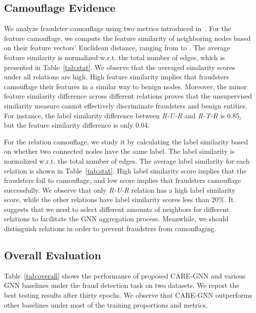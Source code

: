 \subsection{Camouflage Evidence}
\label{sec05:camoflage}
We analyze fraudster camouflage using two metrics introduced in~\cite{liu2020alleviating}. 
For the feature camouflage, we compute the feature similarity of neighboring nodes based on their feature vectors' Euclidean distance, ranging from  to .
The average feature similarity is normalized w.r.t. the total number of edges, which is presented in Table~\ref{tab:stat}.
We observe that the averaged similarity scores under all relations are high.
High feature similarity implies that fraudsters camouflage their features in a similar way to benign nodes.
Moreover, the minor feature similarity difference across different relations proves that the unsupervised similarity measure cannot effectively discriminate fraudsters and benign entities.
For instance, the label similarity difference between \textit{R-U-R} and \textit{R-T-R} is 0.85, but the feature similarity difference is only 0.04.  

For the relation camouflage, we study it by calculating the label similarity based on whether two connected nodes have the same label.
The label similarity is normalized w.r.t. the total number of edges.
The average label similarity for each relation is shown in Table~\ref{tab:stat}.
High label similarity score implies that the fraudsters fail to camouflage, and low score implies that fraudsters camouflage successfully.
We observe that only \textit{R-U-R} relation has a high label similarity score, while the other relations have label similarity scores less than 20\%.
It suggests that we need to select different amounts of neighbors for different relations to facilitate the GNN aggregation process.
Meanwhile, we should distinguish relations in order to prevent fraudsters from camouflaging.

\subsection{Overall Evaluation}
\label{sec05:overall_eval}

Table~\ref{tab:overall} shows the performance of proposed CARE-GNN and various GNN baselines under the fraud detection task on two datasets.
We report the best testing results after thirty epochs. 
We observe that CARE-GNN outperforms other baselines under most of the training proportions and metrics.

